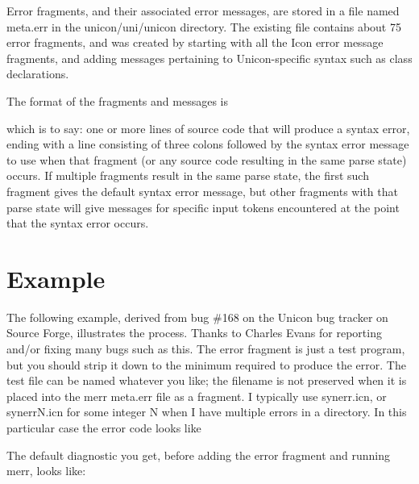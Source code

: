 \documentclass[letterpaper]{article}
\begin{document}
Error fragments, and their associated error messages, are stored in a
file named meta.err in the unicon/uni/unicon directory.  The existing
file contains about 75 error fragments, and was created by starting
with all the Icon error message fragments, and adding messages
pertaining to Unicon-specific syntax such as class declarations.

The format of the fragments and messages is


\noindent which is to say: one or more lines of source code that will
produce a syntax error, ending with a line consisting of three colons
followed by the syntax error message to use when that fragment (or any
source code resulting in the same parse state) occurs.  If multiple
fragments result in the same parse state, the first such fragment
gives the default syntax error message, but other fragments with that
parse state will give messages for specific input tokens encountered
at the point that the syntax error occurs.

\section{Example}

The following example, derived from bug \#168 on the Unicon bug
tracker on Source Forge, illustrates the process. Thanks to Charles
Evans for reporting and/or fixing many bugs such as this.  The error
fragment is just a test program, but you should strip it down to the
minimum required to produce the error. The test file can be named
whatever you like; the filename is not preserved when it is placed
into the merr meta.err file as a fragment. I typically use synerr.icn,
or synerrN.icn for some integer N when I have multiple errors in a
directory.  In this particular case the error code looks like


\noindent The default diagnostic you get, before adding the error fragment
and running merr, looks like:

\end{document}
